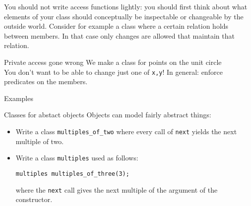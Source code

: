 You should not write access functions lightly: you should first think
about what elements of your class should conceptually be inspectable
or changeable by the outside world.  Consider for example a class
where a certain relation holds between members. In that case only
changes are allowed that maintain that relation.

\begin{block}{Private access gone wrong}
  \label{sl:privatenogood}
  We make a class for points on the unit circle\\
  You don't want to be able to change just one of \lstinline{x,y}!
  In general: enforce predicates on the members.
\end{block}

\begin{comment}
  \Level 1 {Accessors}

  It is a good idea to keep data members private, and use accessor
  functions.

  \begin{exercise}
    \label{ex:geom:twoconstruct}
    Write a \lstinline{Point} class that has two constructors:
    \begin{lstlisting}
      class Point {
        private:
        // data members
        public:
        Point( float x,float y ) { /* ... */ };
        Point( float r,float theta ) { /* ... */ };
        float get_x() { /* ... */ };
        float get_y() { /* ... */ };
        float get_r() { /* ... */ };
        float get_theta() { /* ... */ };
      };
    \end{lstlisting}
    Use $r,\theta$ for the private variables, do not store $x,y$.
  \end{exercise}
\end{comment}

 {Examples}

\begin{block}{Classes for abstact objects}
  \label{sl:intstream}
  Objects can model fairly abstract things:
\end{block}

\begin{exercise}
  \begin{itemize}
  \item
    Write a class \lstinline{multiples_of_two} where every call of
    \lstinline{next} yields the next multiple of two. 
  \item Write a class \lstinline{multiples} used as follows:
\begin{lstlisting}
multiples multiples_of_three(3);      
\end{lstlisting}
  where the \lstinline{next} call gives the next multiple of the
  argument of the constructor.
  \end{itemize}
\end{exercise}

